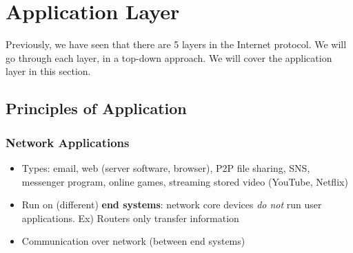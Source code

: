 \section{Application Layer}
Previously, we have seen that there are 5 layers in the Internet protocol. We will go through each layer, in a top-down approach. We will cover the application layer in this section. 
\subsection{Principles of Application}
\subsubsection{Network Applications}
\begin{itemize}
	\item Types: email, web (server software, browser), P2P file sharing, SNS, messenger program, online games, streaming stored video (YouTube, Netflix)
	\item Run on (different) \textbf{end systems}: network core devices \textit{do not} run user applications. Ex) Routers only transfer information
	\item Communication over network (between end systems)
\end{itemize}

